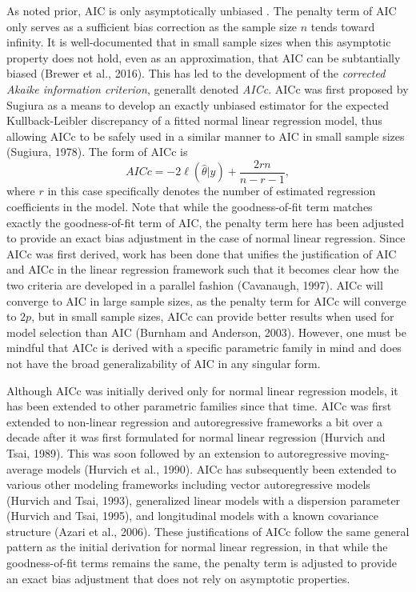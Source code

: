 		As noted prior, AIC is only asymptotically unbiased . The penalty term of AIC only serves as a sufficient bias correction as the sample size $n$ tends toward infinity. It is well-documented that
		in small sample sizes when this asymptotic property does not hold, even as an approximation, that AIC can be subtantially biased (Brewer et al., 2016). This has led to the development of the 
		\textit{corrected Akaike information criterion}, generallt denoted \textit{AICc}. AICc was first proposed by Sugiura as a means to develop an exactly unbiased estimator for the expected
		Kullback-Leibler discrepancy of a fitted normal linear regression model, thus allowing AICc to be safely used in a similar manner to AIC in small sample sizes (Sugiura, 1978). The form of AICc is 
		\begin{equation}
			AICc = -2 \ell(\hat{\theta}|y) + \frac{2 r n}{n - r - 1},
		\end{equation}
		where $r$ in this case specifically denotes the number of estimated regression coefficients in the model. Note that while the goodness-of-fit term matches exactly the goodness-of-fit term
		of AIC, the penalty term here has been adjusted to provide an exact bias adjustment in the case of  normal linear regression. Since AICc was first derived, work has been done that unifies
		the justification of AIC and AICc in the linear regression framework such that it becomes clear how the two criteria are developed in a parallel fashion (Cavanaugh, 1997). AICc will converge
		to AIC in large sample sizes, as the penalty term for AICc will converge to $2p$, but in small sample sizes, AICc can provide better results when used for model selection than AIC
		(Burnham and Anderson, 2003). However, one must be mindful that AICc is derived with a specific parametric family in mind and does not have the broad generalizability of AIC in any singular form.

		Although AICc was initially derived only for normal linear regression models, it has been extended to other parametric families since that time. AICc was first extended to non-linear regression
		and autoregressive frameworks a bit over a decade after it was first formulated for normal linear regression (Hurvich and Tsai, 1989). This was soon followed by an extension to autoregressive
		moving-average models (Hurvich et al., 1990). AICc has subsequently been extended to various other modeling frameworks including vector autoregressive models (Hurvich and Tsai, 1993), generalized
		linear models with a dispersion parameter (Hurvich and Tsai, 1995), and longitudinal models with a known covariance structure (Azari et al., 2006). These justifications of AICc follow the same general
		pattern as the initial derivation for normal linear regression, in that while the goodness-of-fit terms remains the same, the penalty term is adjusted to provide an exact bias adjustment that does
		not rely on asymptotic properties.


